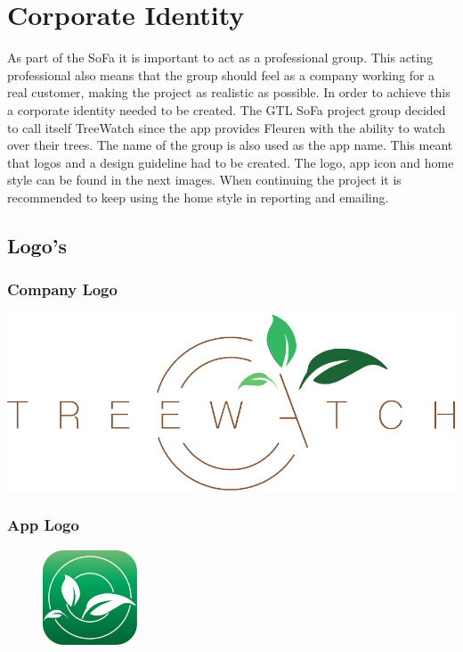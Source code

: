 \documentclass[12pt]{article}
\begin{document}
	\pagebreak
	
	\tableofcontents
	\clearpage
\section{Corporate Identity}
As part of the SoFa it is important to act as a professional group. This acting professional also means that the group should feel as a company working for a real customer, making the project as realistic as possible. In order to achieve this a corporate identity needed to be created. The GTL SoFa project group decided to call itself TreeWatch since the app provides Fleuren with the ability to watch over their trees. The name of the group is also used as the app name. This meant that logos and a design guideline had to be created. The logo, app icon and home style can be found in the next images. When continuing the project it is recommended to keep using the home style in reporting and emailing.
\subsection{Logo's}
\subsubsection{Company Logo}
\includegraphics[width=\textwidth]{TreewatchLogo.pdf}
\subsubsection{App Logo}
\begin{figure}[h]
	\centering
	\includegraphics[width=0.25\textwidth]{TreewatchAppLogo.pdf}
\end{figure}
\clearpage
\end{document}
